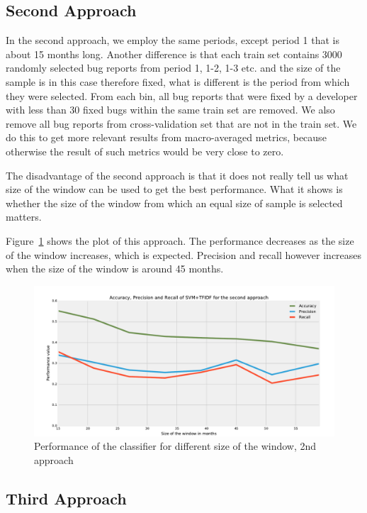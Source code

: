 \subsection{Second Approach}

In the second approach, we employ the same periods, except period 1 that is about 15 months long. Another difference is that each train set contains 3000 randomly selected bug reports from period 1, 1-2, 1-3 etc. and the size of the sample is in this case therefore fixed, what is different is the period from which they were selected. From each bin, all bug reports that were fixed by a developer with less than 30 fixed bugs within the same train set are removed. We also remove all bug reports from cross-validation set that are not in the train set. We do this to get more relevant results from macro-averaged metrics, because otherwise the result of such metrics would be very close to zero.

The disadvantage of the second approach is that it does not really tell us what size of the window can be used to get the best performance. What it shows is whether the size of the window from which an equal size of sample is selected matters.

Figure~\ref{fig:window.firefox.2a} shows the plot of this approach. The performance decreases as the size of the window increases, which is expected. Precision and recall however increases when the size of the window is around 45 months.

\begin{figure}[htbp]
    \centering
        \includegraphics[width=\textwidth]{./images/window_size/firefox_2a.pdf}
    \caption{Performance of the classifier for different size of the window, 2nd approach}
    \label{fig:window.firefox.2a}
\end{figure}

\subsection{Third Approach}

